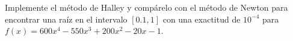 \begin{statement}{3}
  Implemente el m\'etodo de Halley y comp\'arelo con el m\'etodo de Newton
  para encontrar una ra\'iz en el intervalo $[0.1, 1]$ con una
  exactitud de $10^{-4}$ para $f(x) = 600 x^4 - 550 x^3 + 200 x^2 - 20 x - 1$.
\end{statement}